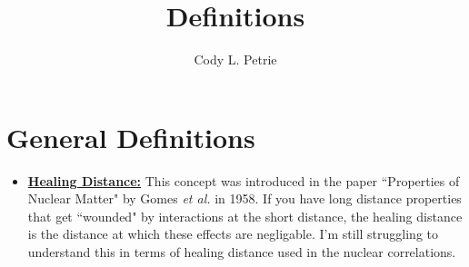 \documentclass[12pt]{extarticle}
\title{Definitions}
\author{Cody L. Petrie}
\begin{document}
\maketitle

\section*{General Definitions}
\begin{itemize}
   \item {\bf \underline{Healing Distance:}} This concept was introduced in the paper ``Properties of Nuclear Matter" by Gomes {\it et al.} in 1958. If you have long distance properties that get ``wounded" by interactions at the short distance, the healing distance is the distance at which these effects are negligable. I'm still struggling to understand this in terms of healing distance used in the nuclear correlations.
\end{itemize}
\end{document}
